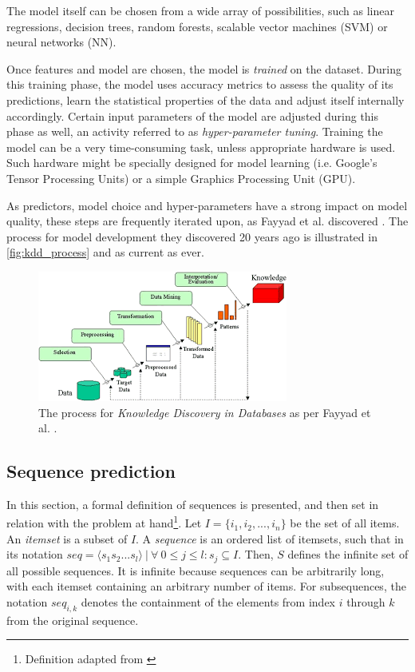 The model itself can be chosen from a wide array of possibilities, such as linear regressions, decision trees, random forests, scalable vector machines (SVM) or neural networks (NN).

Once features and model are chosen, the model is \textit{trained} on the dataset. During this training phase, the model uses accuracy metrics to assess the quality of its predictions, learn the statistical properties of the data and adjust itself internally accordingly. Certain input parameters of the model are adjusted during this phase as well, an activity referred to as \textit{hyper-parameter tuning}. Training the model can be a very time-consuming task, unless appropriate hardware is used. Such hardware might be specially designed for model learning (i.e. Google's Tensor Processing Units) or a simple Graphics Processing Unit (GPU).

As predictors, model choice and hyper-parameters have a strong impact on model quality, these steps are frequently iterated upon, as Fayyad et al. discovered \cite{fayyad1996data}. The process for model development they discovered 20 years ago is illustrated in \autoref{fig:kdd_process} and as current as ever.

\begin{figure}
	\centering
	\includegraphics[width=\textwidth]{gfx/kdd_process}
	\caption{The process for \textit{Knowledge Discovery in Databases} as per Fayyad et al. \cite{fayyad1996data}.}
	\label{fig:kdd_process}
\end{figure}

\subsection{Sequence prediction}
In this section, a formal definition of sequences is presented, and then set in relation with the problem at hand\footnote{Definition adapted from \cite{pei2001prefixspan}}.  Let $I = \{i_1, i_2, ..., i_n\}$ be the set of all items. An \textit{itemset} is a subset of $I$. A \textit{sequence} is an ordered list of itemsets, such that in its notation $seq = \langle s_1s_2...s_l \rangle\ |\ \forall\ 0 \leq j \leq l: s_j \subseteq I$. Then, $S$ defines the infinite set of all possible sequences. It is infinite because sequences can be arbitrarily long, with each itemset containing an arbitrary number of items. For  subsequences, the notation $seq_{i,k}$ denotes the containment of the elements from index $i$ through $k$ from the original sequence.

